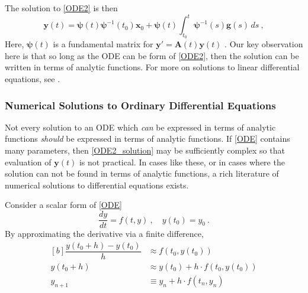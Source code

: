 The solution to \cref{ODE2} is then
%
\begin{equation}\label{ODE2_solution}
\mathbf{y}(t) = \bm{\psi}(t)\bm{\psi}^{-1}(t_0)\mathbf{x}_0 + \bm{\psi}(t)\int_{t_0}^{t}\bm{\psi}^{-1}(s) \mathbf{g}(s) \, ds \>,
\end{equation}
%
Here, $ \bm{\psi}(t) $ is a fundamental matrix for $\mathbf{y}' = \mathbf{A}(t)\mathbf{y}(t) $ . Our key observation here is that so long as the ODE can be form of \cref{ODE2}, then the solution can be written in terms of analytic functions.  For more on solutions to linear differential equations, see \cite{boyce2012differential}.
\subsubsection{Numerical Solutions to Ordinary Differential Equations}

Not every solution to an ODE which \textit{can} be expressed in terms of analytic functions \textit{should} be expressed in terms of analytic functions. If \cref{ODE} contains many parameters, then \cref{ODE2_solution} may be sufficiently complex so that evaluation of $\mathbf{y}(t)$ is not practical.  In cases like these, or in cases where the solution can not be found in terms of analytic functions, a rich literature of numerical solutions to differential equations exists.

Consider a scalar form of \cref{ODE}
%
\begin{equation}\label{scalar_ODE}
	\dfrac{dy}{dt} = f(t,y) \>, \quad y(t_0) = y_0 \>.
\end{equation}
%
By approximating the derivative via a finite difference,
%
\begin{equation}\label{EuerlMethod}
\begin{aligned}[b]
\dfrac{y(t_0 + h) - y(t_0)}{h} &\approx f(t_0,y(t_0)) \\
y(t_0+h) &\approx y(t_0) + h\cdot f(t_0, y(t_0))\\
y_{n+1} & \equiv y_{n}+ h \cdot f(t_n,y_n)
\end{aligned}
\end{equation}

